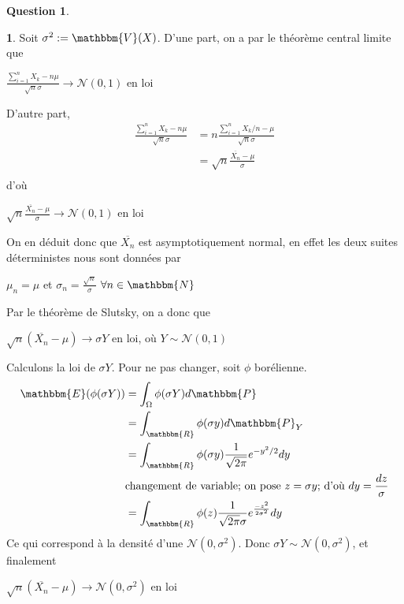 \documentclass[12pt]{article}
\newcommand{\R}{\mathbbm{R}}
\newcommand{\N}{\mathbbm{N}}
\newcommand{\1}{\mathbbm{1}}
\newcommand{\E}{\mathbbm{E}}
\newcommand{\V}{\mathbbm{V}}
\newcommand{\Prob}{\mathbbm{P}}
\newcommand{\Nc}{\mathcal{N}}
\newcommand{\Xn}{\overline{X_n}}
\theoremstyle{definition}\newtheorem{defn}{Définition}
\theoremstyle{definition}\newtheorem{exm}{Exemple}
\theoremstyle{definition}\newtheorem{rem}{Remarque}
\theoremstyle{definition}\newtheorem{algo}{Algorithme}
\theoremstyle{remark}\newtheorem{exo}{Exercice}
\theoremstyle{remark}\newtheorem{nota}{Notation}
\theoremstyle{definition}\newtheorem{1q}{Question}
\theoremstyle{definition}\newtheorem{2q}{Question}
\theoremstyle{definition}\newtheorem{3q}{Question}
\theoremstyle{definition}\newtheorem{4q}{Question}
\theoremstyle{definition}\newtheorem{2qs1}{}
\theoremstyle{definition}\newtheorem{2qs2}{}
\theoremstyle{definition}\newtheorem{2qs3}{}
\theoremstyle{definition}\newtheorem{2qs4}{}
\theoremstyle{definition}\newtheorem{4qs2}{}
\theoremstyle{definition}\newtheorem{4qs3}{}
\begin{document}
\begin{4q}
\begin{4qs2}
Soit $\sigma^2 := \V(X)$.\newline
D'une part, on a par le théorème central limite que
\begin{center}$ \displaystyle\frac{\sum_{i=1}^n X_k-n\mu}{\sqrt{n}\sigma} \longrightarrow \Nc(0,1)$ en loi\end{center}
D'autre part,
\begin{align*}
\displaystyle\frac{\sum_{i=1}^n X_k - n\mu}{\sqrt{n}\sigma} &= \displaystyle n\frac{\sum_{i=1}^n X_k /n -\mu}{\sqrt{n}\sigma}\\
 &= \displaystyle \sqrt{n}\frac{\Xn -\mu}{\sigma}\\
\end{align*}
d'où
\begin{center}$ \displaystyle \sqrt{n}\frac{\Xn -\mu}{\sigma} \longrightarrow \Nc(0,1)$ en loi\end{center}
On en déduit donc 	que $\Xn$ est asymptotiquement normal, en effet les deux suites déterministes nous sont données par
\begin{center}$\mu_n = \mu $ et $\sigma_n = \frac{\sqrt{n}}{\sigma}$ $\forall n\in\N$\end{center}

Par le théorème de Slutsky, on a donc que 
\begin{center}$ \displaystyle \sqrt{n}(\Xn -\mu)\longrightarrow \sigma Y$ en loi, où $Y\sim\Nc(0,1)$ \end{center}
Calculons la loi de $\sigma Y$. Pour ne pas changer, soit $\phi$ borélienne.
\begin{align*}
\E(\phi(\sigma Y)) &= \int_{\Omega}\phi(\sigma Y)d\Prob\\
&= \int_{\R}\phi(\sigma y)d\Prob_Y\\
&= \int_{\R}\phi(\sigma y)\frac{1}{\sqrt{2\pi}}e^{-y^2/2}dy\\
&\text{changement de variable; on pose $z=\sigma y$; d'où $dy = \frac{dz}{\sigma}$}\\
&=\int_{\R}\phi(z)\frac{1}{\sqrt{2\pi}\sigma}e^{\frac{-z^2}{2\sigma^2}}dy\\
\end{align*}
Ce qui correspond à la densité d'une $\Nc(0, \sigma^2)$. \newline
Donc $\sigma Y\sim\Nc(0,\sigma^2)$, et finalement
\begin{center} $ \displaystyle \sqrt{n}(\Xn -\mu)\longrightarrow \Nc(0,\sigma^2)$ en loi\end{center}
\end{4qs2}
\end{4q}
\end{document}
